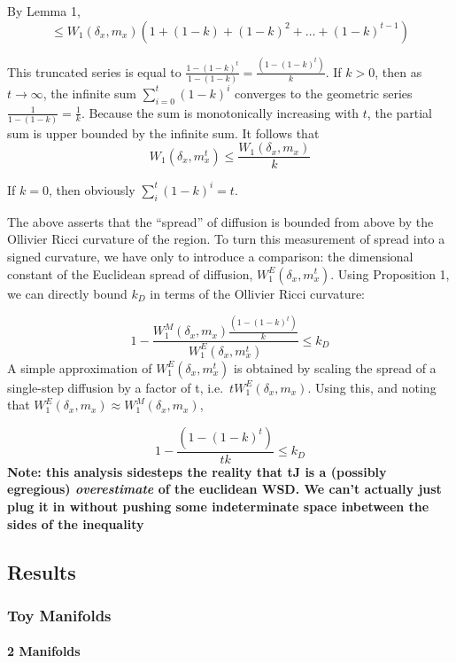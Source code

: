 \documentclass[
]{agujournal2019}
\let\oldparagraph\paragraph
\renewcommand{\paragraph}[1]{\oldparagraph{#1}\mbox{}}
\begin{document}
By Lemma 1, \[
\leq W_1\left(\delta_x,m_x\right)\left(1+(1-k)+(1-k)^2+\ldots+(1-k)^{t-1}\right)
\]

This truncated series is equal to
\(\frac{1-(1-k)^t}{1-(1-k)} = \frac{(1-(1-k)^t)}{k}\). If \(k>0\), then
as \(t \to \infty\), the infinite sum \(\sum_{i=0}^t (1-k)^i\) converges
to the geometric series \(\frac{1}{1-(1-k)} = \frac{1}{k}\). Because the
sum is monotonically increasing with \(t\), the partial sum is upper
bounded by the infinite sum. It follows that \[
W_{1}(\delta_{x},m_{x}^t) \leq \frac{W_1\left(\delta_x,m_x\right)}{k}
\]

If \(k=0\), then obviously \(\sum_{i}^t (1-k)^i = t\).

The above asserts that the ``spread'' of diffusion is bounded from above
by the Ollivier Ricci curvature of the region. To turn this measurement
of spread into a signed curvature, we have only to introduce a
comparison: the dimensional constant of the Euclidean spread of
diffusion, \(W_{1}^E(\delta_{x},m_{x}^t)\). Using Proposition 1, we can
directly bound \(k_{D}\) in terms of the Ollivier Ricci curvature:

\[
1 - \frac{W^M_1\left(\delta_x,m_x\right)\frac{(1-(1-k)^t)}{k}}{W_{1}^E(\delta_{x},m_{x}^t)} \leq k_{D}
\] A simple approximation of \(W_{1}^E(\delta_{x},m_{x}^t)\) is obtained
by scaling the spread of a single-step diffusion by a factor of t,
i.e.~\(tW_{1}^E(\delta_{x},m_{x})\). Using this, and noting that
\(W_{1}^E(\delta_{x},m_{x}) \approx W_{1}^M(\delta_{x},m_{x})\),

\[
1 - \frac{(1-(1-k)^t)}{tk} \leq k_{D}
\] \textbf{Note: this analysis sidesteps the reality that tJ is a
(possibly egregious) \emph{overestimate} of the euclidean WSD. We can't
actually just plug it in without pushing some indeterminate space
inbetween the sides of the inequality}

\subsection{Results}\label{results}

\subsubsection{Toy Manifolds}\label{toy-manifolds}

\paragraph{2 Manifolds}\label{manifolds}
\end{document}
